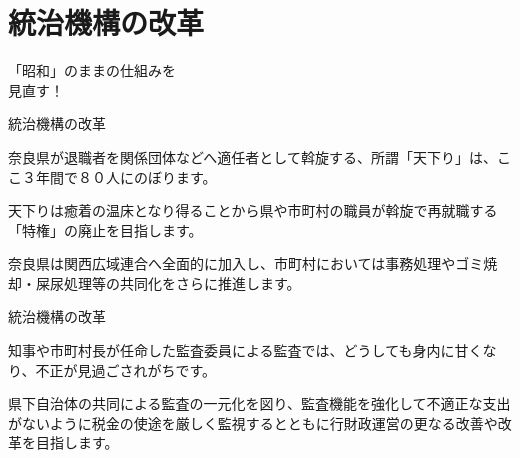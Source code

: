 \documentclass[dvipdfmx]{beamer}
\begin{document}
\section{統治機構の改革}
    \begin{frame}{}{}
        \sectionpage
        \begin{center}
            \begin{large}
                \alert{「昭和」のままの仕組みを}\\\alert{見直す！}
            \end{large}
        \end{center}
    \end{frame}

    \begin{frame}{統治機構の改革}{}
        \begin{small}
            \begin{description}
                \setlength{\parsep}{.5mm}
                \setlength{\itemsep}{2mm}
                \item[天下り禁止] \mbox{}\par
                奈良県が退職者を関係団体などへ適任者として斡旋する、所謂「天下り」は、ここ３年間で８０人にのぼります。\par
                天下りは癒着の温床となり得ることから県や市町村の職員が斡旋で再就職する「特権」の廃止を目指します。
                \item[広域行政の推進] \mbox{}\par
                奈良県は関西広域連合へ全面的に加入し、市町村においては事務処理やゴミ焼却・屎尿処理等の共同化をさらに推進します。
            \end{description}
        \end{small}
    \end{frame}

    \begin{frame}{統治機構の改革}{}
        \begin{small}
            \begin{description}
                \setlength{\parsep}{.5mm}
                \setlength{\itemsep}{2mm}
                \item[監査委員、監査事務局の共同設置] \mbox{}\par
                知事や市町村長が任命した監査委員による監査では、どうしても身内に甘くなり、不正が見過ごされがちです。\par
                県下自治体の共同による監査の一元化を図り、監査機能を強化して不適正な支出がないように税金の使途を厳しく監視するとともに行財政運営の更なる改善や改革を目指します。
            \end{description}
        \end{small}
    \end{frame}
    
\end{document}
